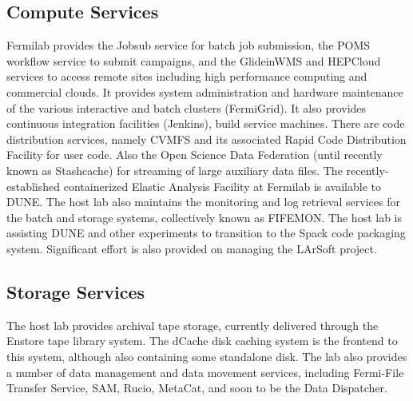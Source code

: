 \documentclass[../main-v1.tex]{subfiles}
\begin{document}
\subsection{Compute Services}
Fermilab provides the Jobsub service for batch job submission, the POMS workflow service to submit campaigns, and the GlideinWMS
and HEPCloud services to access remote sites including high performance computing and commercial clouds. It provides system administration and hardware maintenance of the various interactive and batch clusters (FermiGrid).  It also provides
continuous integration facilities (Jenkins), build service machines.  There are code distribution services, namely CVMFS and its associated Rapid Code Distribution Facility for user code.  Also the Open Science Data Federation (until recently known as 
Stashcache) for streaming of large auxiliary data files. 
The recently-established containerized Elastic Analysis Facility at Fermilab is available to DUNE.  The host lab also maintains
the monitoring and log retrieval services for the batch and storage systems, collectively known as FIFEMON.  The host lab is assisting DUNE and other experiments to transition to the Spack code packaging system.  Significant effort is also provided on managing the LArSoft project.

\subsection{Storage Services}
The host lab provides archival tape storage, currently delivered through the Enstore tape library system.  The dCache 
disk caching system is the frontend to this system, although also containing some standalone disk.  The lab also provides a number of data management and data movement services, including Fermi-File Transfer Service, SAM, Rucio, MetaCat, and soon to be the Data Dispatcher. 

\end{document}
